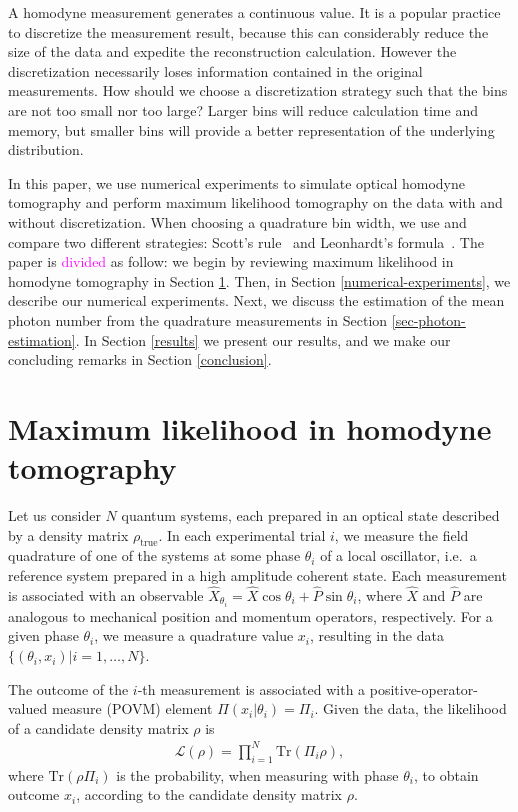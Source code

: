 \documentclass[
reprint,
superscriptaddress,
showpacs,
amsmath,
amssymb,
aps,
pra,
longbibliography
]{revtex4-1}
\providecommand{\editcolor}[2]{\textcolor{#1}{#2}}
\providecommand{\editcolor}[2]{#2}
\newcommand{\SG}[1]{\editcolor{magenta}{#1}}
\newcommand{\rhotrue}{\rho_{\text{true}}}
\begin{document}
A homodyne measurement generates a continuous value.  It is a
  popular practice to discretize the measurement result, because this
  can considerably reduce the size of the data and expedite the
  reconstruction calculation.  However the discretization necessarily
  loses information contained in the original measurements.
 How should we choose a discretization strategy such that the bins are not too small nor too large? Larger bins will reduce calculation time and memory, but
smaller bins will provide a better representation of the underlying distribution.
 
In this paper, we use numerical experiments to simulate optical
homodyne tomography and perform maximum likelihood tomography on the
data with and without discretization. When choosing a quadrature bin
width, we use and compare two different strategies: Scott's
rule~\cite{Scott2010} and Leonhardt's formula~\cite{Leonhardt1996}.
The paper is \SG{divided} as follow: we begin by reviewing maximum
likelihood in homodyne tomography in Section \ref{MLE}. Then, in
Section \ref{numerical-experiments}, we describe our numerical
experiments. Next, we discuss the estimation of the mean photon number
from the quadrature measurements in Section
\ref{sec-photon-estimation}. In Section \ref{results} we present our
results, and we make our concluding remarks in Section
\ref{conclusion}.

\section{Maximum likelihood in homodyne tomography}
\label{MLE}
Let us consider $N$ quantum systems, each prepared in an optical state
described by a density matrix $\rhotrue$. In each experimental trial
$i$, we measure the field quadrature of one of the systems at some
phase $\theta_i$ of a local oscillator, i.e.\ a reference system
prepared in a high amplitude coherent state.  Each measurement is
associated with an observable
$\hat{X}_{\theta_i} = \hat{X} \cos \theta_i + \hat{P} \sin \theta_i$,
where $\hat{X}$ and $\hat{P}$ are analogous to mechanical position and
momentum operators, respectively. For a given phase $\theta_i$, we
measure a quadrature value $x_i$, resulting in the data
$\{(\theta_i, x_i)| i = 1, \ldots, N\}$.

The outcome of the $i$-th measurement is associated with a
positive-operator-valued measure (POVM) element
$\Pi (x_i|\theta_i) = \Pi_i$. Given the data, the likelihood
of a candidate density matrix $\rho$ is
\begin{eqnarray}
  \mathcal{L} (\rho)= \prod_{i=1}^{N} \mathrm{Tr} (\Pi_i \rho),
  \label{eq-likelihood}
\end{eqnarray}
where $\mathrm{Tr}(\rho \Pi_i)$ is the probability, when measuring
with phase $\theta_i$, to obtain outcome $x_i$, according to the
candidate density matrix $\rho$.
\end{document}
